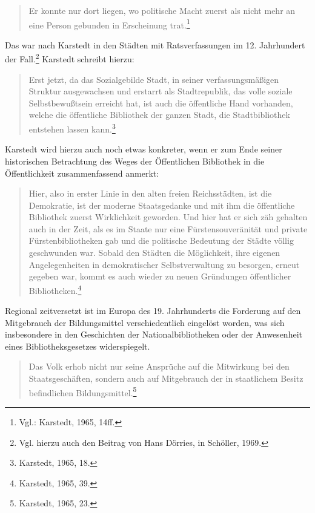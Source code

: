 \documentclass[a4paper,
fontsize=11pt,
oneside,
numbers=noperiodatend,
parskip=half-,
bibliography=totoc,
final
]{scrartcl}
\begin{document}
\begin{quote}
Er konnte nur dort liegen, wo politische Macht zuerst als nicht mehr an
eine Person gebunden in Erscheinung trat.\footnote{Vgl.: Karstedt, 1965,
  14ff.}
\end{quote}

Das war nach Karstedt in den Städten mit Ratsverfassungen im 12.
Jahrhundert der Fall.\footnote{Vgl. hierzu auch den Beitrag von Hans
  Dörries, in Schöller, 1969.} Karstedt schreibt hierzu:

\begin{quote}
Erst jetzt, da das Sozialgebilde Stadt, in seiner verfassungsmäßigen
Struktur ausgewachsen und erstarrt als Stadtrepublik, das volle soziale
Selbstbewußtsein erreicht hat, ist auch die öffentliche Hand vorhanden,
welche die öffentliche Bibliothek der ganzen Stadt, die Stadtbibliothek
entstehen lassen kann.\footnote{Karstedt, 1965, 18.}
\end{quote}

Karstedt wird hierzu auch noch etwas konkreter, wenn er zum Ende seiner
historischen Betrachtung des Weges der Öffentlichen Bibliothek in die
Öffentlichkeit zusammenfassend anmerkt:

\begin{quote}
Hier, also in erster Linie in den alten freien Reichsstädten, ist die
Demokratie, ist der moderne Staatsgedanke und mit ihm die öffentliche
Bibliothek zuerst Wirklichkeit geworden. Und hier hat er sich zäh
gehalten auch in der Zeit, als es im Staate nur eine Fürstensouveränität
und private Fürstenbibliotheken gab und die politische Bedeutung der
Städte völlig geschwunden war. Sobald den Städten die Möglichkeit, ihre
eigenen Angelegenheiten in demokratischer Selbstverwaltung zu besorgen,
erneut gegeben war, kommt es auch wieder zu neuen Gründungen
öffentlicher Bibliotheken.\footnote{Karstedt, 1965, 39.}
\end{quote}

Regional zeitversetzt ist im Europa des 19. Jahrhunderts die Forderung
auf den Mitgebrauch der Bildungsmittel verschiedentlich eingelöst
worden, was sich insbesondere in den Geschichten der
Nationalbibliotheken oder der Anwesenheit eines Bibliotheksgesetzes
widerspiegelt.

\begin{quote}
Das Volk erhob nicht nur seine Ansprüche auf die Mitwirkung bei den
Staatsgeschäften, sondern auch auf Mitgebrauch der in staatlichem Besitz
befindlichen Bildungsmittel.\footnote{Karstedt, 1965, 23.}
\end{quote}
\end{document}
